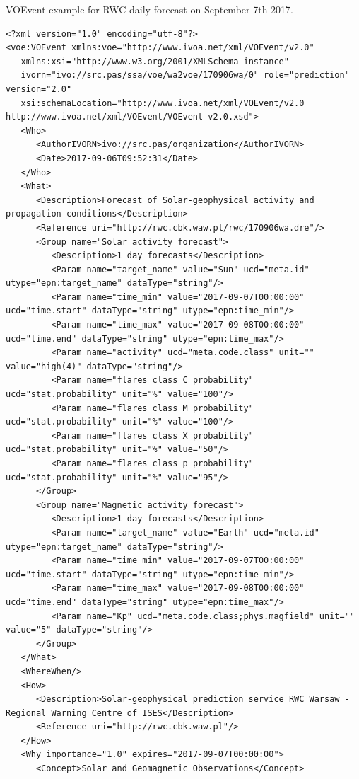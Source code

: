 \documentclass[referee,a4paper,12pt,traditabstract]{swsc}
\begin{document}
\begin{linenumbers}
VOEvent example for RWC daily forecast on September 7th 2017.

{\tiny 
\begin{verbatim}
<?xml version="1.0" encoding="utf-8"?>
<voe:VOEvent xmlns:voe="http://www.ivoa.net/xml/VOEvent/v2.0"
   xmlns:xsi="http://www.w3.org/2001/XMLSchema-instance"
   ivorn="ivo://src.pas/ssa/voe/wa2voe/170906wa/0" role="prediction" version="2.0"
   xsi:schemaLocation="http://www.ivoa.net/xml/VOEvent/v2.0 http://www.ivoa.net/xml/VOEvent/VOEvent-v2.0.xsd">
   <Who>
      <AuthorIVORN>ivo://src.pas/organization</AuthorIVORN>
      <Date>2017-09-06T09:52:31</Date>
   </Who>
   <What>
      <Description>Forecast of Solar-geophysical activity and propagation conditions</Description>
      <Reference uri="http://rwc.cbk.waw.pl/rwc/170906wa.dre"/>
      <Group name="Solar activity forecast">
         <Description>1 day forecasts</Description>
         <Param name="target_name" value="Sun" ucd="meta.id" utype="epn:target_name" dataType="string"/>
         <Param name="time_min" value="2017-09-07T00:00:00" ucd="time.start" dataType="string" utype="epn:time_min"/>
         <Param name="time_max" value="2017-09-08T00:00:00" ucd="time.end" dataType="string" utype="epn:time_max"/>
         <Param name="activity" ucd="meta.code.class" unit="" value="high(4)" dataType="string"/>
         <Param name="flares class C probability" ucd="stat.probability" unit="%" value="100"/>
         <Param name="flares class M probability" ucd="stat.probability" unit="%" value="100"/>
         <Param name="flares class X probability" ucd="stat.probability" unit="%" value="50"/>
         <Param name="flares class p probability" ucd="stat.probability" unit="%" value="95"/>
      </Group>
      <Group name="Magnetic activity forecast">
         <Description>1 day forecasts</Description>
         <Param name="target_name" value="Earth" ucd="meta.id" utype="epn:target_name" dataType="string"/>
         <Param name="time_min" value="2017-09-07T00:00:00" ucd="time.start" dataType="string" utype="epn:time_min"/>
         <Param name="time_max" value="2017-09-08T00:00:00" ucd="time.end" dataType="string" utype="epn:time_max"/>
         <Param name="Kp" ucd="meta.code.class;phys.magfield" unit="" value="5" dataType="string"/>
      </Group>
   </What>
   <WhereWhen/>
   <How>
      <Description>Solar-geophysical prediction service RWC Warsaw - Regional Warning Centre of ISES</Description>
      <Reference uri="http://rwc.cbk.waw.pl"/>
   </How>
   <Why importance="1.0" expires="2017-09-07T00:00:00">
      <Concept>Solar and Geomagnetic Observations</Concept>

\end{verbatim}}
\end{linenumbers}
\end{document}
